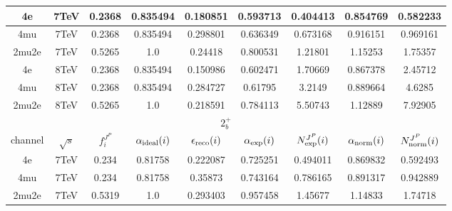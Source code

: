 \begin{table}[b]
\begin{tabular}{c c c c c c c c c}
4e & 7TeV & 0.2368 & 0.835494 & 0.180851 & 0.593713
 & 0.404413%
 & 0.854769 & 0.582233 \\ \hline 4mu & 7TeV & 0.2368 & 0.835494 & 0.298801 & 0.636349
 & 0.673168%
 & 0.916151 & 0.969161 \\ \hline 2mu2e & 7TeV & 0.5265 & 1.0  & 0.24418 & 0.800531
 & 1.21801%
 & 1.15253 & 1.75357 \\ \hline \hline 
4e & 8TeV & 0.2368 & 0.835494 & 0.150986 & 0.602471
 & 1.70669%
 & 0.867378 & 2.45712 \\ \hline 4mu & 8TeV & 0.2368 & 0.835494 & 0.284727 & 0.61795
 & 3.2149%
 & 0.889664 & 4.6285 \\ \hline 2mu2e & 8TeV & 0.5265 & 1.0  & 0.218591 & 0.784113
 & 5.50743%
 & 1.12889 & 7.92905 \\ \hline \hline 
 \multicolumn{9}{|c|}{$2^{+}_{b}$} \\ \hline 
channel & $\sqrt{s}$ & $f_{i}^{J^P}$ & $\alpha_{\rm ideal} (i)$ & $\epsilon_{\rm reco} (i)$ & $\alpha_{\rm exp} (i)$ & $N^{J^P}_{\rm exp} (i)$ & $\alpha_{\rm norm} (i)$ & $N^{J^P}_{\rm norm} (i)$\\ \hline 
4e & 7TeV & 0.234 & 0.81758 & 0.222087 & 0.725251
 & 0.494011%
 & 0.869832 & 0.592493 \\ \hline 4mu & 7TeV & 0.234 & 0.81758 & 0.35873 & 0.743164
 & 0.786165%
 & 0.891317 & 0.942889 \\ \hline 2mu2e & 7TeV & 0.5319 & 1.0  & 0.293403 & 0.957458
 & 1.45677%
 & 1.14833 & 1.74718 \\ \hline \hline 

\end{tabular}
\end{table}
